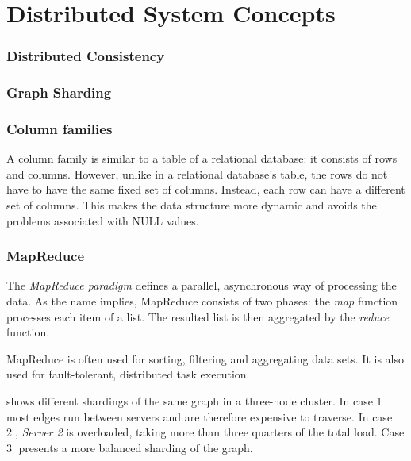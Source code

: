 \section{Distributed System Concepts}

\subsubsection{Distributed Consistency}


\subsubsection{Graph Sharding}


\subsubsection{Column families}

A column family is similar to a table of a relational database: it consists of rows and columns. However, unlike in a relational database's table, the rows do not have to have the same fixed set of columns. Instead, each row can have a different set of columns. This makes the data structure more dynamic and avoids the problems associated with NULL values.

\subsubsection{MapReduce}

The \emph{MapReduce paradigm} defines a parallel, asynchronous way of processing the data. As the name implies, MapReduce consists of two phases: the \emph{map} function processes each item of a list. The resulted list is then aggregated by the \emph{reduce} function.

MapReduce is often used for sorting, filtering and aggregating data sets. It is also used for fault-tolerant, distributed task execution.



 shows different shardings of the same graph in a three-node cluster. 
In case \textcircled{1} most edges run between servers and are therefore expensive to traverse.
In case \textcircled{2}, \emph{Server 2} is overloaded, taking more than three quarters of the total load.
Case \textcircled{3} presents a more balanced sharding of the graph.



